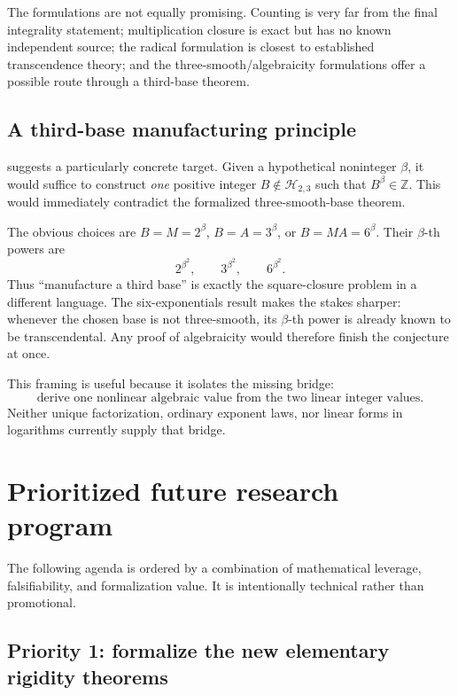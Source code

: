 \documentclass[11pt,oneside]{article}
\theoremstyle{definition}
\newcommand{\Z}{\mathbb Z}
\newcommand{\Smooth}{\mathcal H_{2,3}}
\begin{document}
The formulations are not equally promising.  Counting is very far from the final
integrality statement; multiplication closure is exact but has no known independent
source; the radical formulation is closest to established transcendence theory; and the
three-smooth/algebraicity formulations offer a possible route through a third-base theorem.

\subsection{A third-base manufacturing principle}

 suggests a particularly concrete target.  Given a hypothetical
noninteger \(\beta\), it would suffice to construct \emph{one} positive integer
\(B\notin\Smooth\) such that \(B^\beta\in\Z\).  This would immediately contradict the
formalized three-smooth-base theorem.

The obvious choices are \(B=M=2^\beta\), \(B=A=3^\beta\), or \(B=MA=6^\beta\).
Their \(\beta\)-th powers are
\[
  2^{\beta^2},\qquad 3^{\beta^2},\qquad 6^{\beta^2}.
\]
Thus ``manufacture a third base'' is exactly the square-closure problem in a different
language.  The six-exponentials result makes the stakes sharper: whenever the chosen base
is not three-smooth, its \(\beta\)-th power is already known to be transcendental.  Any
proof of algebraicity would therefore finish the conjecture at once.

This framing is useful because it isolates the missing bridge:
\[
  \boxed{\text{derive one nonlinear algebraic value from the two linear integer values}.}
\]
Neither unique factorization, ordinary exponent laws, nor linear forms in logarithms
currently supply that bridge.

\section{Prioritized future research program}\label{sec:research}

The following agenda is ordered by a combination of mathematical leverage, falsifiability,
and formalization value.  It is intentionally technical rather than promotional.

\subsection{Priority 1: formalize the new elementary rigidity theorems}
\end{document}
